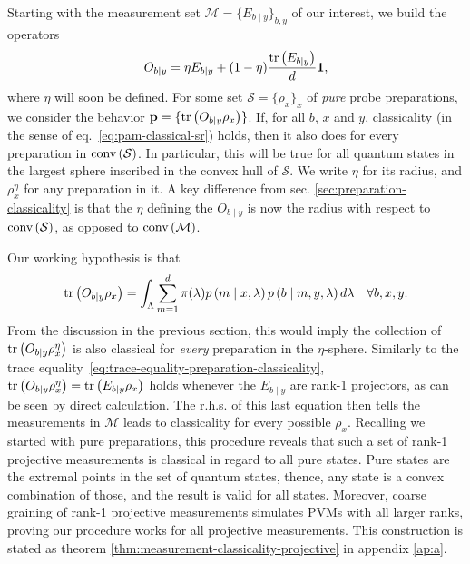         \ornamentbreak

        Starting with the measurement set $\mathcal{M} = \{ E_{b \mid y} \}_{b,y}$ of our interest, we build the operators
        \begin{equation}
            O_{b \mid y} = \eta E_{b \mid y} + (1 - \eta)\frac{\text{tr}\left( E_{b \mid y} \right)}{d} \mathbf{1} ,
        \label{eq:polarized-measurements}
        \end{equation}
        where $\eta$ will soon be defined. For some set $\mathcal{S} = \{ \rho_x \}_x$ of \emph{pure} probe preparations, we consider the behavior $\mathbf{p} = \{ \text{tr}\left( O_{b \mid y} \rho_x  \right) \}$. If, for all $b$, $x$ and $y$, classicality (in the sense of eq.~\eqref{eq:pam-classical-sr}) holds, then it also does for every preparation in $\text{conv} \left( \mathcal{S} \right)$. In particular, this will be true for all quantum states in the largest sphere inscribed in the convex hull of $\mathcal{S}$. We write $\eta$ for its radius, and $\rho_x^\eta$ for any preparation in it. A key difference from sec. \ref{sec:preparation-classicality} is that the $\eta$ defining the $O_{b \mid y}$ is now the radius with respect to $\text{conv} \left( \mathcal{S} \right)$, as opposed to $\text{conv} \left( \mathcal{M} \right)$.

        Our working hypothesis is that
        $$
            \text{tr}\left(  O_{b \mid y} \rho_x \right) = \int_{\Lambda} \sum_{m = 1}^{d} \pi(\lambda) p \left( m \mid x,\lambda \right) p \left( b \mid m,y,\lambda \right) d\lambda \quad\forall b,x,y .
        $$
        From the discussion in the previous section, this would imply the collection of $\text{tr}\left(  O_{b \mid y} \rho_x^\eta \right)$ is also classical for \emph{every} preparation in the $\eta$-sphere. Similarly to the trace equality~\eqref{eq:trace-equality-preparation-classicality}, $\text{tr}\left(  O_{b \mid y} \rho_x^\eta \right) = \text{tr}\left( E_{b \mid y} \rho_x \right)$ holds whenever the $E_{b \mid y}$ are rank-1 projectors, as can be seen by direct calculation. The r.h.s. of this last equation then tells the measurements in $\mathcal{M}$ leads to classicality for every possible $\rho_x$. Recalling we started with pure preparations, this procedure reveals that such a set of rank-1 projective measurements is classical in regard to all pure states. Pure states are the extremal points in the set of quantum states, thence, any state is a convex combination of those, and the result is valid for all states. Moreover, coarse graining of rank-1 projective measurements simulates PVMs with all larger ranks, proving our procedure works for all projective measurements. This construction is stated as theorem \ref{thm:measurement-classicality-projective} in appendix \ref{ap:a}.

